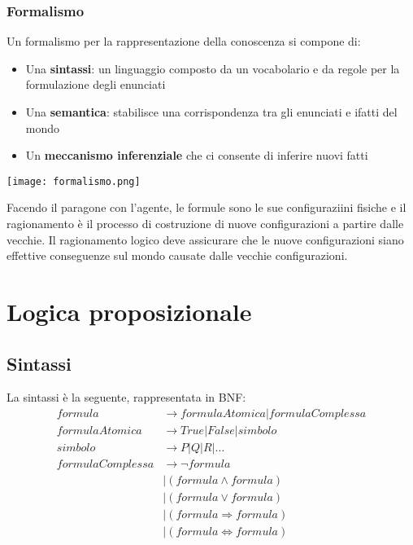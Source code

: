 \subsubsection{Formalismo}
Un formalismo per la rappresentazione della conoscenza si compone di:
\begin{itemize}
	\item Una \textbf{sintassi}: un linguaggio composto da un vocabolario e da regole per la formulazione degli enunciati
	\item Una \textbf{semantica}: stabilisce una corrispondenza tra gli enunciati e ifatti del mondo
	\item Un \textbf{meccanismo inferenziale} che ci consente di inferire nuovi fatti
\end{itemize}
\begin{center}
	\texttt{[image: formalismo.png]}
\end{center}
Facendo il paragone con l'agente, le formule sono le sue configuraziini fisiche e il ragionamento è il processo di costruzione di nuove configurazioni a partire dalle vecchie. Il ragionamento logico deve assicurare che le nuove configurazioni siano effettive conseguenze sul mondo causate dalle vecchie configurazioni.

\section{Logica proposizionale}
\subsection{Sintassi}
La sintassi è la seguente, rappresentata in BNF:
\begin{equation}
	\begin{split}
		formula & \to formulaAtomica \vert formulaComplessa \\
		formulaAtomica & \to True \vert False \vert simbolo \\
		simbolo & \to P \vert Q \vert R \vert \ldots \\
		formulaComplessa & \to \neg formula \\
		&\vert (formula \land formula) \\
		& \vert (formula \lor formula)\\
		& \vert (formula \Rightarrow formula)\\
		& \vert (formula \Leftrightarrow formula)
	\end{split}
\end{equation}

